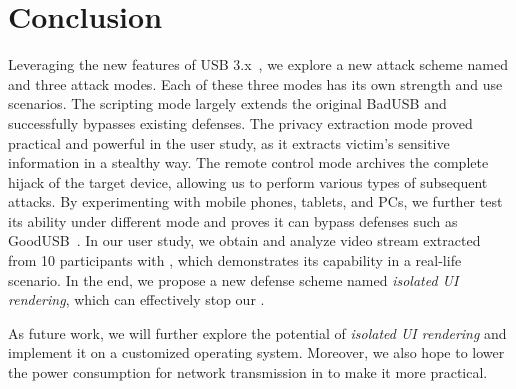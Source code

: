 \section{Conclusion}
\label{sec:conclusion}

Leveraging the new features of USB 3.x~\cite{usb31,usb31,usb32}, we explore a
new attack scheme named \tool and three attack modes. Each of these three modes
has its own strength and use scenarios. The scripting mode largely extends the
original BadUSB and successfully bypasses existing defenses. The privacy
extraction mode proved practical and powerful in the user study, as it extracts
victim's sensitive information in a stealthy way. The remote control mode
archives the complete hijack of the target device, allowing us to perform various
types of subsequent attacks. By experimenting \tool with mobile phones, tablets,
and PCs, we further test its ability under different mode and proves it can
bypass defenses such as GoodUSB~\cite{tian2015defending}. In our user study, we
obtain and analyze video stream extracted from 10 participants with \tool,
which demonstrates its capability in a real-life scenario. In the end, we
propose a new defense scheme named \textit{isolated UI rendering}, which can
effectively stop our \tool.

As future work, we will further explore the potential of \textit{isolated UI
rendering} and implement it on a customized operating system. Moreover, we also
hope to lower the power consumption for network transmission in \tool to make
it more practical.

